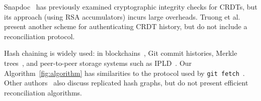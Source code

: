 \documentclass[a4paper,anonymous,USenglish]{lipics-v2019}
\begin{document}
Snapdoc~\cite{Kollmann:2019hf} has previously examined cryptographic integrity checks for CRDTs, but its approach (using RSA accumulators) incurs large overheads.
Truong et al.~\cite{Truong:2012et} present another scheme for authenticating CRDT history, but do not include a reconciliation protocol.

Hash chaining is widely used: in blockchains~\cite{Bano:2019}, Git commit histories, Merkle trees~\cite{Merkle:1987}, and peer-to-peer storage systems such as IPLD~\cite{IPLD}.
Our Algorithm~\ref{fig:algorithm} has similarities to the protocol used by \texttt{git fetch}~\cite{GitHTTP}.
Other authors~\cite{Baird:2016tq,Kang:2003} also discuss replicated hash graphs, but do not present efficient reconciliation algorithms.










\end{document}
